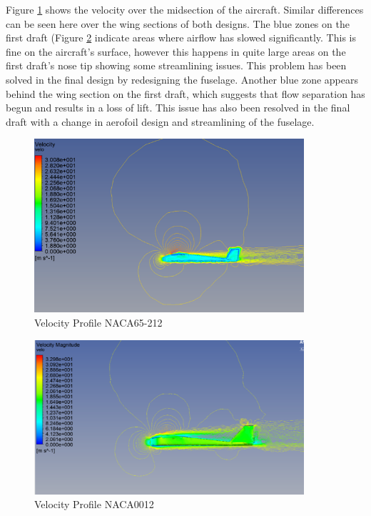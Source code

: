 \documentclass[12pt]{article}
\begin{document}
\noindent Figure \ref{fig:vel} shows the velocity over the midsection of the aircraft. Similar differences can be seen here over the wing sections of both designs. The blue zones on the first draft (Figure \ref{fig:velbad} indicate areas where airflow has slowed significantly. This is fine on the aircraft’s surface, however this happens in quite large areas on the first draft’s nose tip showing some streamlining issues. This problem has been solved in the final design by redesigning the fuselage. Another blue zone appears behind the wing section on the first draft, which suggests that flow separation has begun and results in a loss of lift. This issue has also been resolved in the final draft with a change in aerofoil design and streamlining of the fuselage. \\

\begin{figure}[h!]
    \includegraphics[width=10cm, scale=1]{velocity.png}
    \caption{Velocity Profile NACA65-212}
    \label{fig:vel}
\end{figure}

\begin{figure}[h!]
    \includegraphics[width=10cm, scale=1]{badvel.png}
    \caption{Velocity Profile NACA0012}
    \label{fig:velbad}
\end{figure}
\end{document}

